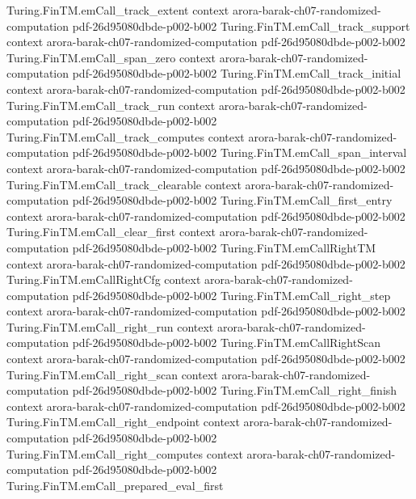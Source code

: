 \begin{theorem}
\proofstep
  {Turing.FinTM.emCall_track_extent}
  {context}
  {arora-barak-ch07-randomized-computation}
  {pdf-26d95080dbde-p002-b002}
\proofstep
  {Turing.FinTM.emCall_track_support}
  {context}
  {arora-barak-ch07-randomized-computation}
  {pdf-26d95080dbde-p002-b002}
\proofstep
  {Turing.FinTM.emCall_span_zero}
  {context}
  {arora-barak-ch07-randomized-computation}
  {pdf-26d95080dbde-p002-b002}
\proofstep
  {Turing.FinTM.emCall_track_initial}
  {context}
  {arora-barak-ch07-randomized-computation}
  {pdf-26d95080dbde-p002-b002}
\proofstep
  {Turing.FinTM.emCall_track_run}
  {context}
  {arora-barak-ch07-randomized-computation}
  {pdf-26d95080dbde-p002-b002}
\proofstep
  {Turing.FinTM.emCall_track_computes}
  {context}
  {arora-barak-ch07-randomized-computation}
  {pdf-26d95080dbde-p002-b002}
\proofstep
  {Turing.FinTM.emCall_span_interval}
  {context}
  {arora-barak-ch07-randomized-computation}
  {pdf-26d95080dbde-p002-b002}
\proofstep
  {Turing.FinTM.emCall_track_clearable}
  {context}
  {arora-barak-ch07-randomized-computation}
  {pdf-26d95080dbde-p002-b002}
\proofstep
  {Turing.FinTM.emCall_first_entry}
  {context}
  {arora-barak-ch07-randomized-computation}
  {pdf-26d95080dbde-p002-b002}
\proofstep
  {Turing.FinTM.emCall_clear_first}
  {context}
  {arora-barak-ch07-randomized-computation}
  {pdf-26d95080dbde-p002-b002}
\proofstep
  {Turing.FinTM.emCallRightTM}
  {context}
  {arora-barak-ch07-randomized-computation}
  {pdf-26d95080dbde-p002-b002}
\proofstep
  {Turing.FinTM.emCallRightCfg}
  {context}
  {arora-barak-ch07-randomized-computation}
  {pdf-26d95080dbde-p002-b002}
\proofstep
  {Turing.FinTM.emCall_right_step}
  {context}
  {arora-barak-ch07-randomized-computation}
  {pdf-26d95080dbde-p002-b002}
\proofstep
  {Turing.FinTM.emCall_right_run}
  {context}
  {arora-barak-ch07-randomized-computation}
  {pdf-26d95080dbde-p002-b002}
\proofstep
  {Turing.FinTM.emCallRightScan}
  {context}
  {arora-barak-ch07-randomized-computation}
  {pdf-26d95080dbde-p002-b002}
\proofstep
  {Turing.FinTM.emCall_right_scan}
  {context}
  {arora-barak-ch07-randomized-computation}
  {pdf-26d95080dbde-p002-b002}
\proofstep
  {Turing.FinTM.emCall_right_finish}
  {context}
  {arora-barak-ch07-randomized-computation}
  {pdf-26d95080dbde-p002-b002}
\proofstep
  {Turing.FinTM.emCall_right_endpoint}
  {context}
  {arora-barak-ch07-randomized-computation}
  {pdf-26d95080dbde-p002-b002}
\proofstep
  {Turing.FinTM.emCall_right_computes}
  {context}
  {arora-barak-ch07-randomized-computation}
  {pdf-26d95080dbde-p002-b002}
\proofstep
  {Turing.FinTM.emCall_prepared_eval_first}

\end{theorem}
